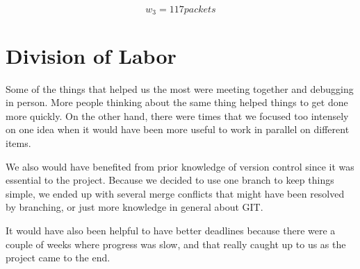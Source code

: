 \documentclass{article}
\begin{document}
$$w_3 = 117 packets$$



















\section{Division of Labor}

	Some of the things that helped us the most were meeting together and debugging in person. More people thinking about the same thing helped things to get done more quickly. On the other hand, there were times that we focused too intensely on one idea when it would have been more useful to work in parallel on different items.

	We also would have benefited from prior knowledge of version control since it was essential to the project. Because we decided to use one branch to keep things simple, we ended up with several merge conflicts that might have been resolved by branching, or just more knowledge in general about GIT.

	It would have also been helpful to have better deadlines because there were a couple of weeks where progress was slow, and that really caught up to us as the project came to the end.
\end{document}
